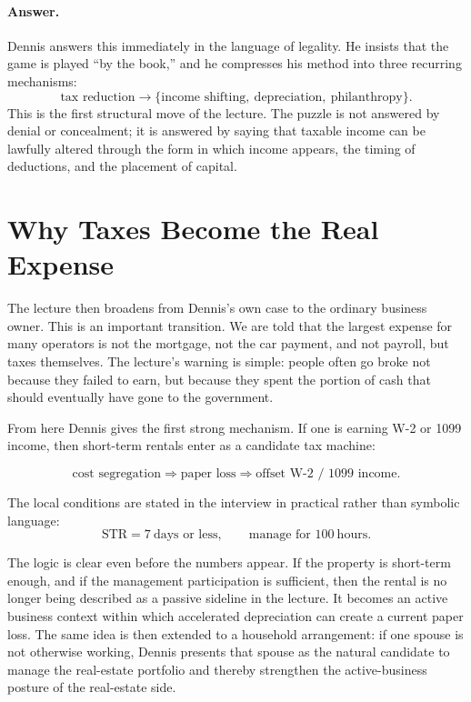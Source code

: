 \paragraph{Answer.} Dennis answers this immediately in the language of legality. He insists that the game is played ``by the book,'' and he compresses his method into three recurring mechanisms:
\begin{equation}
\text{tax reduction}
\to
\{\text{income shifting},\ \text{depreciation},\ \text{philanthropy}\}.
\end{equation}
This is the first structural move of the lecture. The puzzle is not answered by denial or concealment; it is answered by saying that taxable income can be lawfully altered through the form in which income appears, the timing of deductions, and the placement of capital.

\section{Why Taxes Become the Real Expense}

The lecture then broadens from Dennis's own case to the ordinary business owner. This is an important transition. We are told that the largest expense for many operators is not the mortgage, not the car payment, and not payroll, but taxes themselves. The lecture's warning is simple: people often go broke not because they failed to earn, but because they spent the portion of cash that should eventually have gone to the government.

From here Dennis gives the first strong mechanism. If one is earning W-2 or 1099 income, then short-term rentals enter as a candidate tax machine:

\begin{equation}
\text{cost segregation}
\Rightarrow
\text{paper loss}
\Rightarrow
\text{offset W-2 / 1099 income}.
\end{equation}

The local conditions are stated in the interview in practical rather than symbolic language:
\begin{equation}
\mathrm{STR}=7\ \text{days or less},
\qquad
\text{manage for }100\ \text{hours}.
\end{equation}

The logic is clear even before the numbers appear. If the property is short-term enough, and if the management participation is sufficient, then the rental is no longer being described as a passive sideline in the lecture. It becomes an active business context within which accelerated depreciation can create a current paper loss. The same idea is then extended to a household arrangement: if one spouse is not otherwise working, Dennis presents that spouse as the natural candidate to manage the real-estate portfolio and thereby strengthen the active-business posture of the real-estate side.

